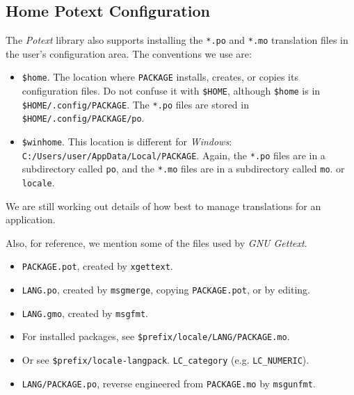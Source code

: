 \documentclass[
 11pt,
 twoside,
 a4paper,
 final                                 %
]{article}
\begin{document}
\subsection{Home Potext Configuration}
\label{subsec:introduction_home_potext_configuration}

   The \textsl{Potext} library also supports installing the
   \texttt{*.po} and \texttt{*.mo} translation files in the
   user's configuration area.
   The conventions we use are:

   \begin{itemize}
      \item \texttt{\$home}. The location where \texttt{PACKAGE} installs,
         creates, or copies its configuration files.
         Do not confuse it with \texttt{\$HOME},
         although \texttt{\$home} is in
         \texttt{\$HOME/.config/PACKAGE}.
         The \texttt{*.po} files are stored in
         \texttt{\$HOME/.config/PACKAGE/po}.
      \item \texttt{\$winhome}. This location is different for
         \textsl{Windows}:
         \texttt{C:/Users/user/AppData/Local/PACKAGE}.
         Again, the \texttt{*.po} files are in a
         subdirectory called \texttt{po},
         and the \texttt{*.mo} files are in a
         subdirectory called \texttt{mo}.
         or \texttt{locale}.
   \end{itemize}

   We are still working out details of how best to manage
   translations for an application.

   Also, for reference, we mention some of the files used by
   \textsl{GNU Gettext}.

   \begin{itemize}
      \item \texttt{PACKAGE.pot}, created by \texttt{xgettext}.
      \item \texttt{LANG.po}, created by \texttt{msgmerge},
         copying \texttt{PACKAGE.pot}, or by editing.
      \item \texttt{LANG.gmo}, created by \texttt{msgfmt}.
      \item For installed packages, see
         \texttt{\$prefix/locale/LANG/PACKAGE.mo}.
      \item Or see
         \texttt{\$prefix/locale-langpack}.
         \texttt{LC\_category} (e.g. \texttt{LC\_NUMERIC}).
      \item \texttt{LANG/PACKAGE.po}, reverse engineered from
         \texttt{PACKAGE.mo} by \texttt{msgunfmt}.
   \end{itemize}
\end{document}
